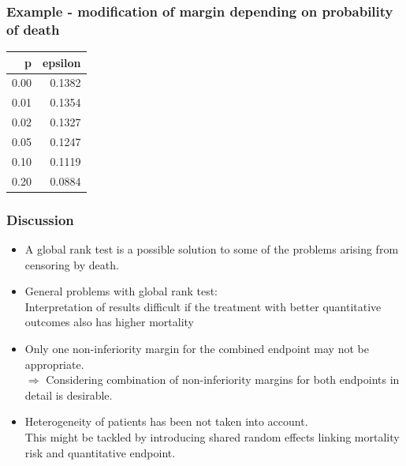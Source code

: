 \documentclass[xcolor=pdftex,dvipsnames,table]{beamer}\usepackage[]{graphicx}\usepackage[]{color}
\begin{document}
\begin{frame}[fragile] %
\frametitle{Example - modification of margin depending on probability of death}

\begin{table}[ht]
\centering
\begin{tabular}{rr}
  \hline
p & epsilon \\ 
  \hline
0.00 & 0.1382 \\ 
  0.01 & 0.1354 \\ 
  0.02 & 0.1327 \\ 
  0.05 & 0.1247 \\ 
  0.10 & 0.1119 \\ 
  0.20 & 0.0884 \\ 
   \hline
\end{tabular}
\end{table}

\end{frame}

\begin{frame} %
\frametitle{Discussion}
\begin{itemize}
\item A global rank test is a possible solution to some of the problems arising from censoring by death.
\item General problems with global rank test: \\
      Interpretation of results difficult if the treatment with better quantitative outcomes also has higher mortality \\
\item Only one non-inferiority margin for the combined endpoint may not be appropriate. \\
$\Rightarrow$  Considering combination of non-inferiority margins for both endpoints in detail is desirable.
\item Heterogeneity of patients has been not taken into account. \\
      This might be tackled by introducing shared random effects linking mortality risk and quantitative endpoint.
\end{itemize}
\end{frame}


\end{document}
